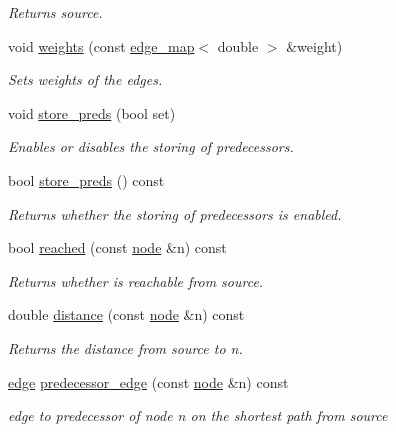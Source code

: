 \begin{DoxyCompactItemize}
\begin{DoxyCompactList}\small\item\em Returns source. \end{DoxyCompactList}\item 
void \mbox{\hyperlink{classbellman__ford_a9e276cc9f30c2e608d320db4a08b2a74}{weights}} (const \mbox{\hyperlink{classedge__map}{edge\+\_\+map}}$<$ double $>$ \&weight)
\begin{DoxyCompactList}\small\item\em Sets weights of the edges. \end{DoxyCompactList}\item 
void \mbox{\hyperlink{classbellman__ford_aac87169a3cf4f95477ce215a0cb7a12b}{store\+\_\+preds}} (bool set)
\begin{DoxyCompactList}\small\item\em Enables or disables the storing of predecessors. \end{DoxyCompactList}\item 
bool \mbox{\hyperlink{classbellman__ford_a2ded0950bfaca6c3ee65a3617c1ccaa8}{store\+\_\+preds}} () const
\begin{DoxyCompactList}\small\item\em Returns whether the storing of predecessors is enabled. \end{DoxyCompactList}\item 
bool \mbox{\hyperlink{classbellman__ford_a93f7c34ec9662690230ca7a9c31933cd}{reached}} (const \mbox{\hyperlink{classnode}{node}} \&n) const
\begin{DoxyCompactList}\small\item\em Returns whether is reachable from source. \end{DoxyCompactList}\item 
double \mbox{\hyperlink{classbellman__ford_a881e5b021e69aced997185208438f910}{distance}} (const \mbox{\hyperlink{classnode}{node}} \&n) const
\begin{DoxyCompactList}\small\item\em Returns the distance from source to {\itshape n}. \end{DoxyCompactList}\item 
\mbox{\hyperlink{classedge}{edge}} \mbox{\hyperlink{classbellman__ford_a39f93b0b1e427cf26059fa6141c6f61c}{predecessor\+\_\+edge}} (const \mbox{\hyperlink{classnode}{node}} \&n) const
\begin{DoxyCompactList}\small\item\em edge to predecessor of node {\itshape n} on the shortest path from source \end{DoxyCompactList}\item 

\end{DoxyCompactItemize}
